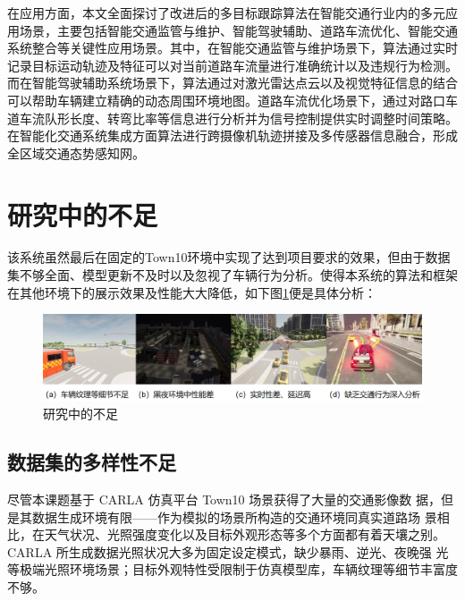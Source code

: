 在应用方面，本文全面探讨了改进后的多目标跟踪算法在智能交通行业内的多元应用场景，主要包括智能交通监管与维护、智能驾驶辅助、道路车流优化、智能交通系统整合等关键性应用场景。其中，在智能交通监管与维护场景下，算法通过实时记录目标运动轨迹及特征可以对当前道路车流量进行准确统计以及违规行为检测\cite{tongji2021vision}。而在智能驾驶辅助系统场景下，算法通过对激光雷达点云以及视觉特征信息的结合可以帮助车辆建立精确的动态周围环境地图\cite{baidu2022sensor}。道路车流优化场景下，通过对路口车道车流队形长度、转弯比率等信息进行分析并为信号控制提供实时调整时间策略\cite{path2020optimization}。在智能化交通系统集成方面算法进行跨摄像机轨迹拼接及多传感器信息融合，形成全区域交通态势感知网\cite{chen2023integration}。



\section{研究中的不足}


该系统虽然最后在固定的Town10环境中实现了达到项目要求的效果，但由于数据集不够全面、模型更新不及时以及忽视了车辆行为分析。使得本系统的算法和框架在其他环境下的展示效果及性能大大降低，如下图\ref{fig:p34}便是具体分析：




\begin{figure}[htbp] %
	\centering
	\includegraphics[width=1\textwidth]{p34} %
	\caption{研究中的不足} %
	\label{fig:p34} %
\end{figure}



\subsection{数据集的多样性不足}

尽管本课题基于 CARLA 仿真平台 Town10 场景获得了大量的交通影像数 据，但是其数据生成环境有限——作为模拟的场景所构造的交通环境同真实道路场 景相比，在天气状况、光照强度变化以及目标外观形态等多个方面都有着天壤之别。CARLA 所生成数据光照状况大多为固定设定模式，缺少暴雨、逆光、夜晚强 光等极端光照环境场景；目标外观特性受限制于仿真模型库，车辆纹理等细节丰富度不够。



